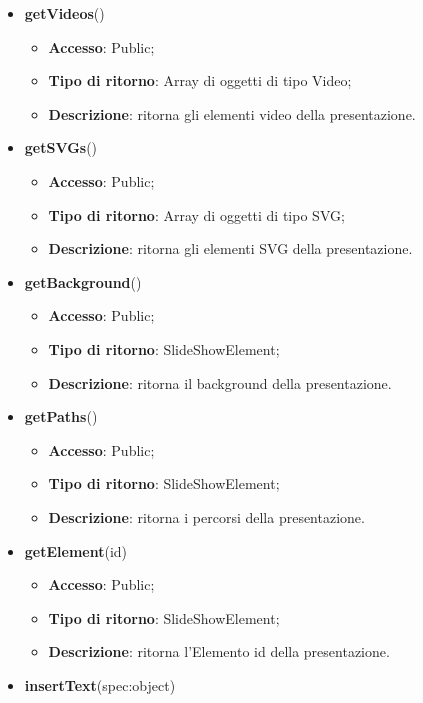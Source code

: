 {\begin{itemize}
\begin{itemize}
			\end{itemize}
			\item \textbf{getVideos}()
			\begin{itemize}
				\item \textbf{Accesso}: Public;
				\item \textbf{Tipo di ritorno}: Array di oggetti di tipo Video;
				\item \textbf{Descrizione}: ritorna gli elementi video della presentazione.
			\end{itemize}
			\item \textbf{getSVGs}()
			\begin{itemize}
				\item \textbf{Accesso}: Public;
				\item \textbf{Tipo di ritorno}: Array di oggetti di tipo SVG;
				\item \textbf{Descrizione}: ritorna gli elementi SVG della presentazione.
			\end{itemize}
			\item \textbf{getBackground}()
			\begin{itemize}
				\item \textbf{Accesso}: Public;
				\item \textbf{Tipo di ritorno}: SlideShowElement;
				\item \textbf{Descrizione}: ritorna il background della presentazione.
			\end{itemize}
			\item \textbf{getPaths}()
			\begin{itemize}
				\item \textbf{Accesso}: Public;
				\item \textbf{Tipo di ritorno}: SlideShowElement;
				\item \textbf{Descrizione}: ritorna i percorsi della presentazione.
			\end{itemize}
			\item \textbf{getElement}(id)
			\begin{itemize}
				\item \textbf{Accesso}: Public;
				\item \textbf{Tipo di ritorno}: SlideShowElement;
				\item \textbf{Descrizione}: ritorna l'Elemento id della presentazione.
			\end{itemize}
			\item \textbf{insertText}(spec:object)
			\begin{itemize}

\end{itemize}
\end{itemize}}
